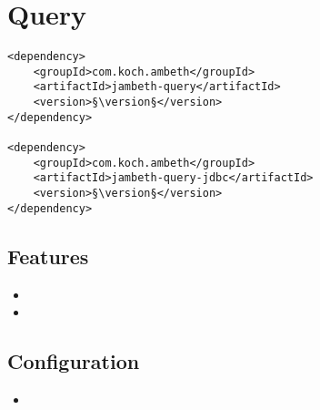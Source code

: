 \section{Query}
\label{module:Query}
\ClearAPI
\TODO
\begin{lstlisting}[style=POM,caption={Maven modules to use \emph{Ambeth Query}}]
<dependency>
	<groupId>com.koch.ambeth</groupId>
	<artifactId>jambeth-query</artifactId>
	<version>§\version§</version>
</dependency>

<dependency>
	<groupId>com.koch.ambeth</groupId>
	<artifactId>jambeth-query-jdbc</artifactId>
	<version>§\version§</version>
</dependency>
\end{lstlisting}
\subsection{Features}
\begin{itemize}
	\item {}
	\item \TODO
\end{itemize}

\subsection{Configuration}
\begin{itemize}
	\item {}
\end{itemize}
